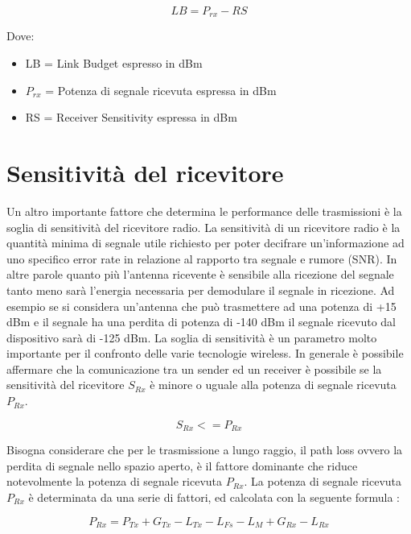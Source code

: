 \documentclass[12pt,a4paper,openright,twoside]{report}
\begin{document}
\begin{equation*} LB = P_{rx} - RS \end{equation*}

Dove:
\begin{itemize}                       
\item LB = Link Budget espresso in dBm 
\item $ P_{rx}$ = Potenza di segnale ricevuta espressa in dBm 
\item RS = Receiver Sensitivity espressa in dBm
\end{itemize}

\section{Sensitivit\`a del ricevitore}
Un altro importante fattore che determina le performance delle trasmissioni \`e la soglia di sensitivit\`a del ricevitore radio. 
La sensitivit\`a di un ricevitore radio \`e la quantit\`a minima di segnale utile richiesto per poter decifrare un'informazione ad uno specifico error rate in relazione al rapporto tra segnale e rumore (SNR). 
In altre parole quanto pi\`u l'antenna ricevente \`e sensibile alla ricezione del segnale tanto meno sar\`a l'energia necessaria per demodulare il segnale in ricezione. 
Ad esempio se si considera un'antenna che pu\`o trasmettere ad una potenza di +15 dBm e il segnale ha una perdita di potenza di -140 dBm il segnale ricevuto dal dispositivo sar\`a di -125 dBm. 
La soglia di sensitivit\`a \`e un parametro molto importante per il confronto delle varie tecnologie wireless.
In generale \`e possibile affermare che la comunicazione tra un sender ed un receiver \`e possibile se la sensitivit\`a del ricevitore $S_{Rx}$ \`e minore o uguale alla potenza di segnale ricevuta $P_{Rx}$.  


\begin{equation*} S_{Rx} <= P_{Rx} \end{equation*}

Bisogna considerare che per le trasmissione a lungo raggio, il path loss ovvero la perdita di segnale nello spazio aperto, \`e il fattore dominante che riduce notevolmente la potenza di segnale ricevuta $P_{Rx}$.
La potenza di segnale ricevuta $P_{Rx}$ \`e determinata da una serie di fattori, ed calcolata con la seguente formula :

\begin{equation*} P_{Rx}= P_{Tx} + G_{Tx} - L_{Tx}- L_{Fs} - L_{M} + G_{Rx} - L_{Rx} \end{equation*}
\end{document}
